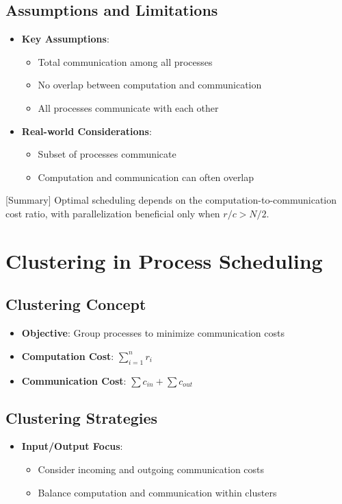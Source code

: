 \documentclass[12pt]{article}
\begin{document}
\subsection{Assumptions and Limitations}
\begin{itemize}
  \item \textbf{Key Assumptions}:
        \begin{itemize}
          \item Total communication among all processes
          \item No overlap between computation and communication
          \item All processes communicate with each other
        \end{itemize}

  \item \textbf{Real-world Considerations}:
        \begin{itemize}
          \item Subset of processes communicate
          \item Computation and communication can often overlap
        \end{itemize}
\end{itemize}

[Summary] Optimal scheduling depends on the computation-to-communication cost ratio, with parallelization beneficial only when $r/c > N/2$.

\section{Clustering in Process Scheduling}

\subsection{Clustering Concept}
\begin{itemize}
  \item \textbf{Objective}: Group processes to minimize communication costs
  \item \textbf{Computation Cost}: $\sum_{i=1}^n r_i$
  \item \textbf{Communication Cost}: $\sum c_{in} + \sum c_{out}$
\end{itemize}

\subsection{Clustering Strategies}
\begin{itemize}
  \item \textbf{Input/Output Focus}:
        \begin{itemize}
          \item Consider incoming and outgoing communication costs
          \item Balance computation and communication within clusters
        \end{itemize}
\end{itemize}
\end{document}
